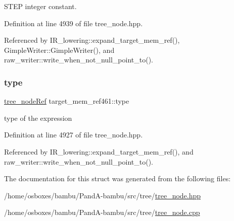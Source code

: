 S\+T\+EP integer constant. 



Definition at line 4939 of file tree\+\_\+node.\+hpp.



Referenced by I\+R\+\_\+lowering\+::expand\+\_\+target\+\_\+mem\+\_\+ref(), Gimple\+Writer\+::\+Gimple\+Writer(), and raw\+\_\+writer\+::write\+\_\+when\+\_\+not\+\_\+null\+\_\+point\+\_\+to().

\mbox{\label{structtarget__mem__ref461_a4ba471cb926104c900abd5edfe396aed}} 
\subsubsection{\texorpdfstring{type}{type}}
{\footnotesize\ttfamily \hyperlink{tree__node_8hpp_a6ee377554d1c4871ad66a337eaa67fd5}{tree\+\_\+node\+Ref} target\+\_\+mem\+\_\+ref461\+::type}



type of the expression 



Definition at line 4927 of file tree\+\_\+node.\+hpp.



Referenced by I\+R\+\_\+lowering\+::expand\+\_\+target\+\_\+mem\+\_\+ref(), and raw\+\_\+writer\+::write\+\_\+when\+\_\+not\+\_\+null\+\_\+point\+\_\+to().



The documentation for this struct was generated from the following files\+:\begin{DoxyCompactItemize}
\item 
/home/osboxes/bambu/\+Pand\+A-\/bambu/src/tree/\hyperlink{tree__node_8hpp}{tree\+\_\+node.\+hpp}\item 
/home/osboxes/bambu/\+Pand\+A-\/bambu/src/tree/\hyperlink{tree__node_8cpp}{tree\+\_\+node.\+cpp}\end{DoxyCompactItemize}
